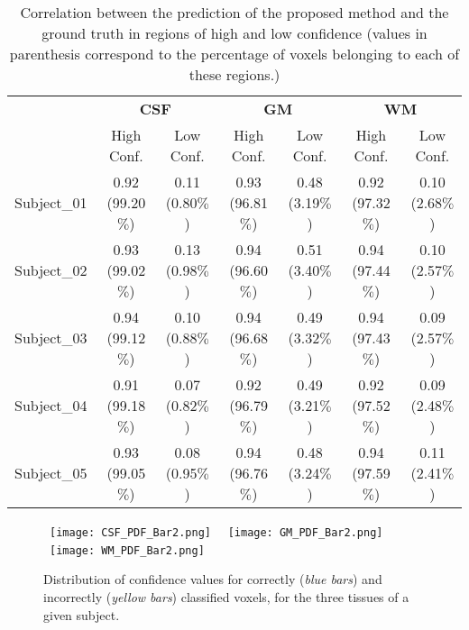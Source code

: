 \documentclass[twoside,espcrc2]{elsarticle}
\begin{document}
\begin{table}[ht!]
\footnotesize
\centering
\caption{Correlation between the prediction of the proposed method and the ground truth in regions of high and low confidence (values in parenthesis correspond to the percentage of voxels belonging to each of these regions.)}
\label{tab:correlation}
\begin{tabular}{lcccccc}
\toprule
 & \multicolumn{2}{c}{\textbf{CSF}} & \multicolumn{2}{c}{\textbf{GM}} & \multicolumn{2}{c}{\textbf{WM}} \\ 
\cmidrule(lr){2-3}\cmidrule(lr){4-5}\cmidrule(lr){6-7}
& High Conf. & Low Conf. & High Conf. & Low Conf. & High Conf. & Low Conf.  \\ 
\midrule\midrule
Subject\_01 &  0.92 (99.20$\%$) & 0.11 (0.80$\%$)   & 0.93 (96.81$\%$) &  0.48 (3.19$\%$) & 0.92 (97.32$\%$) &  0.10 (2.68$\%$)  \\
Subject\_02 &  0.93 (99.02$\%$) &  0.13 (0.98$\%$)  & 0.94 (96.60$\%$) & 0.51 (3.40$\%$) & 0.94 (97.44$\%$) &  0.10 (2.57$\%$) \\
Subject\_03 &  0.94 (99.12$\%$) & 0.10 (0.88$\%$)  & 0.94 (96.68$\%$)  & 0.49 (3.32$\%$)  & 0.94 (97.43$\%$) & 0.09 (2.57$\%$)   \\
Subject\_04 & 0.91 (99.18$\%$) & 0.07 (0.82$\%$)  & 0.92 (96.79$\%$)   &  0.49 (3.21$\%$)&  0.92 (97.52$\%$) & 0.09 (2.48$\%$)    \\
Subject\_05 & 0.93 (99.05$\%$)   &  0.08 (0.95$\%$)  & 0.94 (96.76$\%$)  & 0.48 (3.24$\%$) & 0.94 (97.59$\%$) &  0.11 (2.41$\%$)                \\ 
\bottomrule
\end{tabular}
\end{table}


\begin{figure}[ht!]
\begin{center}
     \mbox{
        \texttt{[image: CSF\_PDF\_Bar2.png]}
        }
     \mbox{
        \texttt{[image: GM\_PDF\_Bar2.png]}
        }
   \mbox{
        \texttt{[image: WM\_PDF\_Bar2.png]}
        }     
\caption{Distribution of confidence values for correctly (\textit{blue bars}) and incorrectly (\textit{yellow bars}) classified voxels, for the three tissues of a given subject.}
\label{fig:PDF_Condifence}
\end{center}
\end{figure}
\end{document}
